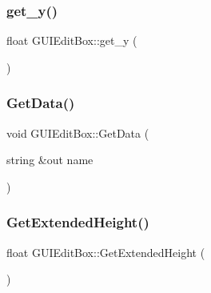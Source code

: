 \hypertarget{class_g_u_i_edit_box_a6dfca75d45a5e3c43aa5ba2be6a5143a}{}\label{class_g_u_i_edit_box_a6dfca75d45a5e3c43aa5ba2be6a5143a} 
\subsubsection{\texorpdfstring{get\+\_\+y()}{get\_y()}}
{\footnotesize\ttfamily float G\+U\+I\+Edit\+Box\+::get\+\_\+y (\begin{DoxyParamCaption}{ }\end{DoxyParamCaption})}

\hypertarget{class_g_u_i_edit_box_a5100480531fe51881142d81bdb701b42}{}\label{class_g_u_i_edit_box_a5100480531fe51881142d81bdb701b42} 
\subsubsection{\texorpdfstring{Get\+Data()}{GetData()}}
{\footnotesize\ttfamily void G\+U\+I\+Edit\+Box\+::\+Get\+Data (\begin{DoxyParamCaption}\item[{string \&out}]{name }\end{DoxyParamCaption})}

\hypertarget{class_g_u_i_edit_box_a659968b0b08739118f210135d7b51e65}{}\label{class_g_u_i_edit_box_a659968b0b08739118f210135d7b51e65} 
\subsubsection{\texorpdfstring{Get\+Extended\+Height()}{GetExtendedHeight()}}
{\footnotesize\ttfamily float G\+U\+I\+Edit\+Box\+::\+Get\+Extended\+Height (\begin{DoxyParamCaption}{ }\end{DoxyParamCaption})}

\hypertarget{class_g_u_i_edit_box_a4cdc6ac26ffd8e910724ed3782ae4b45}{}\label{class_g_u_i_edit_box_a4cdc6ac26ffd8e910724ed3782ae4b45} 
